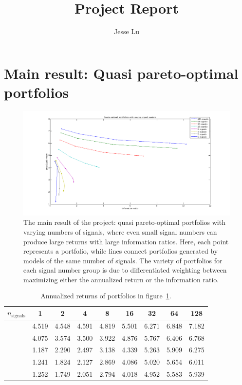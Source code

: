 \documentclass{article}
\title{Project Report}
\author{Jesse Lu}
\begin{document}
\maketitle

\section{Main result: Quasi pareto-optimal portfolios}
    \begin{figure}[t]
        \centerline{\includegraphics[width=1.8\textwidth]{result.png}}
        \caption{The main result of the project: 
                quasi pareto-optimal portfolios with varying numbers of signals,
                where even small signal numbers can produce large returns
                with large information ratios.
            Here, each point represents a portfolio, 
                while lines connect portfolios 
                generated by models of the same number of signals.
            The variety of portfolios for each signal number group
                is due to differentiated weighting between maximizing
                either the annualized return or the information ratio.
            }
        \label{result}
    \end{figure}

    \begin{table}\centering
        \begin{tabular}{l c c c c c c c c}
        $n_\text{signals}$ & 1 & 2 & 4 & 8 & 16 & 32 & 64 & 128  \\ \hline
        & 4.519 & 4.548 & 4.591 & 4.819 & 5.501 & 6.271 & 6.848 & 7.182  \\
        & 4.075 & 3.574 & 3.500 & 3.922 & 4.876 & 5.767 & 6.406 & 6.768  \\
        & 1.187 & 2.290 & 2.497 & 3.138 & 4.339 & 5.263 & 5.909 & 6.275  \\
        & 1.241 & 1.824 & 2.127 & 2.869 & 4.086 & 5.020 & 5.654 & 6.011  \\
        & 1.252 & 1.749 & 2.051 & 2.794 & 4.018 & 4.952 & 5.583 & 5.939 
        \end{tabular}
        \caption{Annualized returns of portfolios in figure~\ref{result}.}
        \label{table:ret}
    \end{table}
\end{document}
